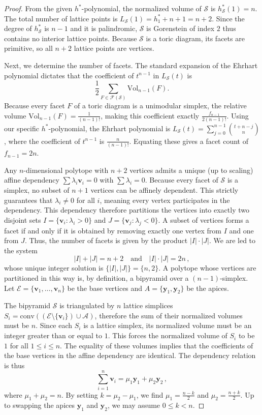 \documentclass[10pt,a4paper]{amsart}
\newcommand{\Aa}{{\mathcal A}}
\newcommand{\Ee}{{\mathcal E}}
\newcommand{\Ss}{{\mathcal S}}
\begin{document}
\begin{proof}
From the given $h^\ast$-polynomial, the normalized volume of $\Ss$ is $h_{\Ss}^\ast(1) = n$. 
The total number of lattice points is $L_{\Ss}(1) = h_1^\ast + n + 1 = n+2$. Since the degree of 
$h_{\Ss}^\ast$ is $n-1$ and it is palindromic, $\Ss$ is Gorenstein of index $2$ thus contains no interior 
lattice points. Because $\Ss$ is a toric diagram, its facets are primitive, so all $n+2$ lattice points are vertices.
		
Next, we determine the number of facets. The standard expansion of the Ehrhart polynomial dictates that the 
coefficient of $t^{n-1}$ in $L_{\Ss}(t)$ is
\[
\frac{1}{2} \sum_{F \in \mathcal{F}(\Ss)} \text{Vol}_{n-1}(F). 
\]
Because every facet $F$ of a toric diagram is a unimodular simplex, the relative volume 
$\text{Vol}_{n-1}(F) = \frac{1}{(n-1)!}$, making this coefficient exactly $\frac{f_{n-1}}{2(n-1)!}$. Using our specific 
$h^\ast$-polynomial, the Ehrhart polynomial is $L_{\Ss}(t) = \sum_{j=0}^{n-1} \binom{t+n-j}{n}$, where the coefficient 
of $t^{n-1}$ is $\frac{n}{(n-1)!}$. Equating these gives a facet count of $f_{n-1} = 2n$.
		
Any $n$-dimensional polytope with $n+2$ vertices admits a unique (up to scaling) affine dependency 
$\sum \lambda_i \bm{v}_i = 0$ with $\sum \lambda_i = 0$. Because every facet of $\Ss$ is a simplex, no subset of 
$n+1$ vertices can be affinely dependent. This strictly guarantees that $\lambda_i \neq 0$ for all $i$, meaning every vertex 
participates in the dependency. This dependency therefore partitions the vertices into exactly two disjoint sets 
$I = \{\bm{v}_i : \lambda_i > 0\}$ and $J = \{\bm{v}_j : \lambda_j < 0\}$. A subset of vertices forms a facet if and only if it is 
obtained by removing exactly one vertex from $I$ and one from $J$. Thus, the number of facets is given by the product 
$|I| \cdot |J|$. We are led to the system
\[ 
|I| + |J| = n+2 \quad \text{and} \quad |I| \cdot |J| = 2n\,,
\]
whose unique integer solution is $\{|I|, |J|\} = \{n, 2\}$. A polytope whose vertices are partitioned in this way is, 
by definition, a bipyramid over a $(n-1)$-simplex. Let $\Ee = \{\bm{v}_1, \dots, \bm{v}_n\}$ be the base vertices and 
$A = \{\bm{y}_1, \bm{y}_2\}$ be the apices.
		
The bipyramid $\Ss$ is triangulated by $n$ lattice simplices $S_i = \text{conv}((\Ee \setminus \{\bm{v}_i\}) \cup \Aa)$,
therefore the sum of their normalized volumes must be $n$. Since each $S_i$ is a lattice simplex, its normalized volume must 
be an integer greater than or equal to $1$. This forces the normalized volume of $S_i$ to be $1$ for all $1 \le i \le n$. The equality 
of these volumes implies that the coefficients of the base vertices in the affine dependency are identical. The dependency relation 
is thus
\[
\sum_{i=1}^n \bm{v}_i = \mu_1 \bm{y}_1 + \mu_2 \bm{y}_2 \,,
\]
where $\mu_1 + \mu_2 = n$. By setting $k = \mu_2 - \mu_1$, we find $\mu_1 = \frac{n-k}{2}$ and $\mu_2 = \frac{n+k}{2}$. 
Up to swapping the apices $\bm{y}_1$ and $\bm{y}_2$, we may assume $0 \le k < n$.
		

\end{proof}
\end{document}
